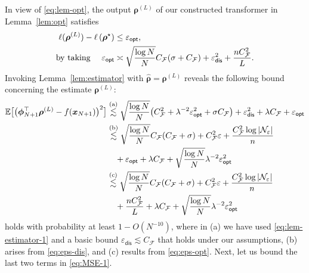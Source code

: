 \documentclass[english]{article}
\begin{document}
In view of \eqref{eq:lem-opt}, the output ${\bm \rho}^{(L)}$ of our constructed transformer in Lemma~\ref{lem:opt} 
satisfies %
\begin{align}\label{eq:eps-opt}
\ell({{\bm \rho}^{(L)}}) 
- \ell\left({\bm \rho}^{\star}\right)
&\le \varepsilon_{\mathsf{opt}},\notag\\
\text{by taking }\quad {\varepsilon}_{\mathsf{opt}} &\asymp \sqrt{\frac{\log N}{N}}C_{\mathcal{F}}(\sigma + C_{\mathcal{F}})
+\varepsilon_{\mathsf{dis}}^2 + \frac{nC_{\mathcal{F}}^2}{L}.
\end{align}
Invoking Lemma~\ref{lem:estimator} with $\widehat{\bm \rho} = {\bm \rho}^{(L)}$ reveals the following bound concerning the estimate ${\bm \rho}^{(L)}$:
%
\begin{align}\label{eq:MSE-1}
\mathbb{E}\big[\big({\bm \phi}_{N+1}^{\top}{{\bm \rho}}^{(L)} - f({\bm x}_{N+1})\big)^2\big]
&\overset{\text{(a)}}{\lesssim} \sqrt{\frac{\log N}{N}}\big(C_{\mathcal{F}}^2 + \lambda^{-2}\varepsilon_{\mathsf{opt}}^2 + \sigma C_\mathcal{F}\big) + \varepsilon_{\mathsf{dis}}^2 + \lambda C_{\mathcal{F}} + \varepsilon_{\mathsf{opt}}\notag\\
&\overset{\text{(b)}}{\lesssim} \sqrt{\frac{\log N}{N}}C_{\mathcal{F}}(C_{\mathcal{F}} + \sigma) + C_{\mathcal{F}}^2\varepsilon + \frac{C_{\mathcal{F}}^2\log|\mathcal{N}_\varepsilon|}{n}\notag\\
&\quad + \varepsilon_{\mathsf{opt}} + \lambda C_{\mathcal{F}} + \sqrt{\frac{\log N}{N}}\lambda^{-2}\varepsilon_{\mathsf{opt}}^2\notag\\
&\overset{\text{(c)}}{\lesssim} \sqrt{\frac{\log N}{N}}C_{\mathcal{F}}(C_{\mathcal{F}} + \sigma) + C_{\mathcal{F}}^2\varepsilon + \frac{C_{\mathcal{F}}^2\log|\mathcal{N}_\varepsilon|}{n}\notag\\
&\quad + \frac{nC_{\mathcal{F}}^2}{L} + \lambda C_{\mathcal{F}} + \sqrt{\frac{\log N}{N}}\lambda^{-2}\varepsilon_{\mathsf{opt}}^2
\end{align}
%
holds with probability at least $1-O(N^{-10})$, 
where in (a) we have used  \eqref{eq:lem-estimator-1} and a basic bound $\varepsilon_{\mathsf{dis}}\lesssim C_\mathcal{F}$ that holds under our assumptions, (b) arises from \eqref{eq:eps-dis}, and (c) results from \eqref{eq:eps-opt}.
Next, let us bound the last two terms in \eqref{eq:MSE-1}. 
%
\end{document}
